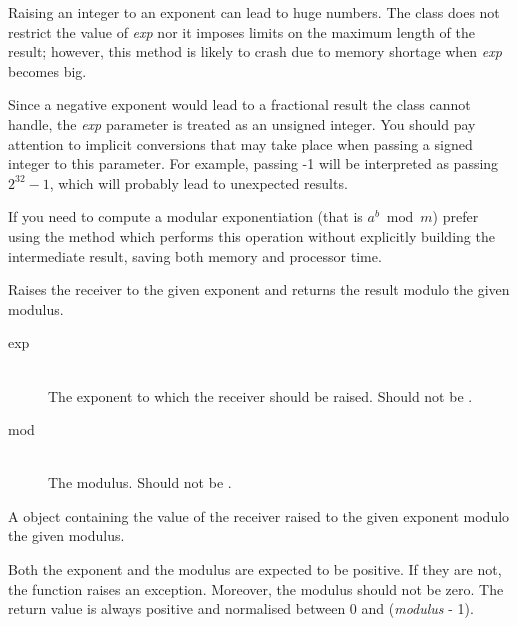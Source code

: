 \docdiscuss

Raising an integer to an exponent can lead to huge numbers. The  class does not restrict the value of \emph{exp} nor it imposes limits on the maximum length of the result; however, this method is likely to crash due to memory shortage when \emph{exp} becomes big.

Since a negative exponent would lead to a fractional result the  class cannot handle, the \emph{exp} parameter is treated as an unsigned integer. You should pay attention to implicit conversions that may take place when passing a signed integer to this parameter. For example, passing -1 will be interpreted as passing $2^{32}-1$, which will probably lead to unexpected results.

If you need to compute a modular exponentiation (that is $a^b \bmod m$) prefer using the  method which performs this operation without explicitly building the intermediate result, saving both memory and processor time.



Raises the receiver to the given exponent and returns the result modulo the given modulus.


\docparams

\begin{description}
\item[exp] \hfill \\ The exponent to which the receiver should be raised. Should not be .
\item[mod] \hfill \\ The modulus. Should not be .
\end{description}

\docretval

A  object containing the value of the receiver raised to the given exponent modulo the given modulus.

\docdiscuss

Both the exponent and the modulus are expected to be positive. If they are not, the function raises an exception. Moreover, the modulus should not be zero.
The return value is always positive and normalised between 0 and (\emph{modulus} - 1).


